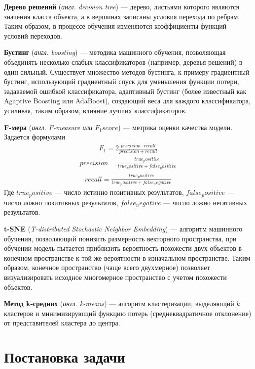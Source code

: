 \documentclass[times,specification,annotation]{itmo-student-thesis}
\begin{document}
\textbf{Дерево решений} \cite{quinlan1986induction} (\textit{англ. decision tree}) --- дерево, листьями которого являются значения класса объекта, а в вершинах записаны условия перехода по ребрам. Таким образом, в процессе обучения изменяются коэффициенты функций условий переходов.   

\textbf{Бустинг} (\textit{англ. boosting}) --- методика машинного обучения, позволяющая объединять несколько слабых классификаторов (например, деревья решений) в один сильный. Существует множество методов бустинга, к примеру градиентный бустинг\cite{friedman2002stochastic}, использующий градиентный спуск для уменьшения функции потери, задаваемой ошибкой классификатора, адаптивный бустинг (более известный как Agaptive Boosting или AdaBoost)\cite{freund1997decision}, создающий веса для каждого классификатора, усиливая, таким образом, влияние лучших классификаторов.  

\textbf{F-мера} (\textit{англ. F-measure или $F_1 score$}) --- метрика оценки качества модели. Задается формулами
 \begin{align*}
F_1 = 2 \frac{precision \cdot recall}{precision + recall}
\end{align*}
 \begin{align*}
precision = \frac{true_positive}{true_positive + false_positive}
\end{align*}
 \begin{align*}
recall = \frac{true_positive}{true_positive + false_negative}
\end{align*}
Где $true_positive$ --- число истинно позитивных результатов, $false_positive$ --- число ложно позитивных результатов, $false_negative$ --- число ложно негативных результатов.

\textbf{t-SNE} (\textit{T-distributed Stochastic Neighbor Embedding})\cite{maaten2008visualizing} --- алгоритм машинного обучения, позволяющий понизить размерность векторного пространства, при обучении модель пытается приблизить вероятность похожести двух объектов в конечном пространстве к той же вероятности в изначальном пространстве. Таким образом, конечное пространство (чаще всего двухмерное) позволяет визуализировать исходное многомерное пространство с учетом похожести объектов. 

\textbf{Метод k-средних} (\textit{англ. k-means})\cite{lloyd1982least} --- алгоритм кластеризации, выделяющий $k$ кластеров и минимизирующий функцию потерь (среднеквадратичное отклонение) от представителей кластера до центра.  

\section{Постановка задачи}\label{sec:intro}
\end{document}
